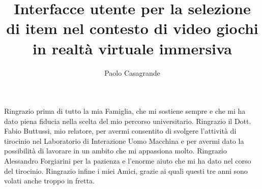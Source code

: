 \documentclass[target=bach,aauheader=]{thud}
\title{Interfacce utente per la selezione \\ di item nel contesto di video giochi \\ in realtà virtuale immersiva}
\author{Paolo Casagrande}
\begin{document}
\maketitle


\acknowledgements
Ringrazio prima di tutto la mia Famiglia, che mi sostiene sempre e che mi ha dato piena fiducia nella scelta del mio percorso universitario.
Ringrazio il Dott. Fabio Buttussi, mio relatore, per avermi consentito di svolgere l'attività di tirocinio nel Laboratorio di Interazione Uomo Macchina e per avermi dato la possibilità di lavorare in un ambito che mi appassiona molto.
Ringrazio Alessandro Forgiarini per la pazienza e l'enorme aiuto che mi ha dato nel corso del tirocinio.
Ringrazio infine i miei Amici, grazie ai quali questi tre anni sono volati anche troppo in fretta.   


\tableofcontents


\listoffigures

\mainmatter

\end{document}
